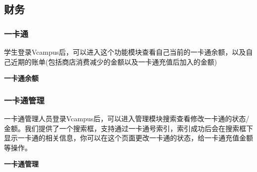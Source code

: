 \documentclass{article}
\begin{document}
\subsection{财务}

\subsubsection{一卡通}
学生登录Vcampus后，可以进入这个功能模块查看自己当前的一卡通余额，以及自己近期的账单(包括商店消费减少的金额以及一卡通充值后加入的金额)
\begin{center}
\textbf{一卡通余额}
\end{center}

\subsubsection{一卡通管理}
一卡通管理人员登录Vcampus后，可以进入管理模块搜索查看修改一卡通的状态/金额。我们提供了一个搜索框，支持通过一卡通号索引，索引成功后会在搜索框下显示一卡通的相关信息，你可以在这个页面更改一卡通的状态，给一卡通充值金额等操作。
\begin{center}
\textbf{一卡通管理}
\end{center}
\end{document}
